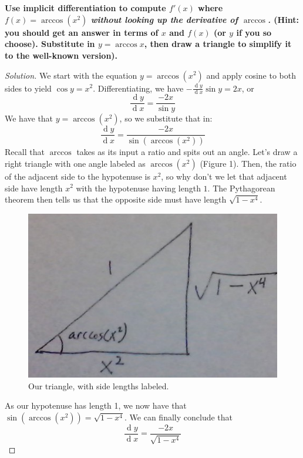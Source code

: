 \documentclass[english,fleqn]{article}
\renewcommand{\d}[1]{\ensuremath{\operatorname{d}\!{#1}}}
\newcommand{\dydx}[2]{\frac{\d #1}{\d #2}}
\newcommand{\prob}[1]{\setcounter{section}{#1-1}\section{}}
\theoremstyle{remark}
\theoremstyle{definition}
\begin{document}
\prob{2} \textbf{Use implicit differentiation to compute $f'(x)$ where $f(x)=\arccos({x^2})$ \emph{without looking up the derivative of $\arccos$.} (Hint: you should get an answer in terms of $x$ and $f(x)$ (or $y$ if you so choose). Substitute in $y=\arccos x$, then draw a triangle to simplify it to the well-known version).}%
\begin{proof}[Solution]
	We start with the equation $y=\arccos(x^2)$ and apply cosine to both sides to yield $\cos y=x^2$. Differentiating, we have $-\dydx{y}{x}\sin y=2x$, or $$\dydx{y}{x}=\frac{-2x}{\sin y}$$
	We have that $y=\arccos (x^2)$, so we substitute that in:
	$$\dydx{y}{x}=\frac{-2x}{\sin(\arccos(x^2))}$$
	Recall that $\arccos$ takes as its input a ratio and spits out an angle. Let's draw a right triangle with one angle labeled as $\arccos(x^2)$ (Figure 1). Then, the ratio of the adjacent side to the hypotenuse is $x^2$, so why don't we let that adjacent side have length $x^2$ with the hypotenuse having length $1$. The Pythagorean theorem then tells us that the opposite side must have length $\sqrt{1-x^4}$.
	
	\begin{figure}[h!]\centering
		\includegraphics[scale=.5]{triangle}\caption{Our triangle, with side lengths labeled.}
	\end{figure}
	
	 As our hypotenuse has length 1, we now have that $\sin(\arccos(x^2))=\sqrt{1-x^4}$. We can finally conclude that $$\dydx{y}{x}=\frac{-2x}{\sqrt{1-x^4}}$$
\end{proof}
\end{document}
